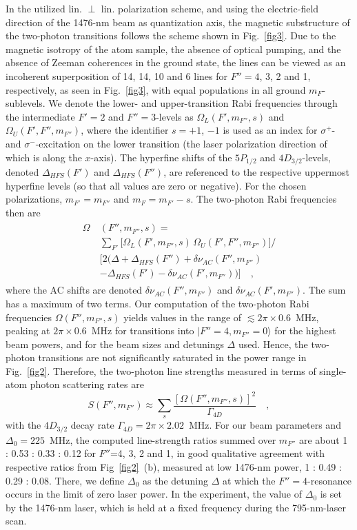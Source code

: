 \documentclass[reprint, amsmath,amssymb, aps, pra, longbibliography]{revtex4-1}
\begin{document}
In the utilized lin. $\perp$ lin. polarization scheme, and using the electric-field direction of the 1476-nm beam as quantization axis, the magnetic substructure of the two-photon transitions follows the scheme
shown in Fig.~\ref{fig3}. Due to the magnetic isotropy of the atom sample, the absence of optical pumping, and the absence of Zeeman coherences in the ground state, the lines can be viewed as an incoherent superposition of 14, 14, 10 and 6 lines for $F''=4$, 3, 2 and 1, respectively, as seen in Fig.~\ref{fig3}, with equal populations in all ground $m_F$-sublevels. 
We denote the lower- and upper-transition Rabi frequencies through the
intermediate $F'=2$ and $F''=3$-levels as $\Omega_{L} (F',m_{F''}, s)$ and $\Omega_{U} (F',F'',m_{F''})$, where the identifier $s=+1$, $-1$ is used as an index for $\sigma^+$- and $\sigma^-$-excitation on the lower transition (the laser polarization direction of which is along the $x$-axis). The hyperfine shifts of the
$5P_{1/2}$ and $4D_{3/2}$-levels, denoted
$\Delta_{HFS}(F')$ and $\Delta_{HFS}(F'')$, are referenced to the respective uppermost hyperfine levels (so that all values are zero or negative). For the chosen polarizations, $m_{F'}=m_{F''}$ and $m_F=m_{F'}-s$. The two-photon Rabi frequencies then are 
\begin{align}
\label{eq:2phrabi}
\begin{split}
\Omega\ &(F'',m_{F''}, s) = \\
&\sum_{F'} \big[ \Omega_{L} (F',m_{F''}, s) \, \Omega_{U} (F',F'',m_{F''}) \Big] / \\ 
&\big[2 (\Delta + \Delta_{HFS}(F'')  + \delta\nu_{AC}(F'',m_{F''}) \\ 
&-  \Delta_{HFS}(F')  -  \delta\nu_{AC}( F',m_{F''}) )\big] \quad,
\end{split}
\end{align}
where the AC shifts are denoted $\delta\nu_{AC}(F'',m_{F''})$ and $\delta\nu_{AC}(F',m_{F''})$. The sum has a maximum of two terms. 
Our computation of the two-photon Rabi frequencies $\Omega(F'',m_{F''}, s)$ 
yields values in the range of $\lesssim 2 \pi \times 0.6$~MHz, peaking at $2 \pi \times 0.6$~MHz for transitions into $\vert F''=4, m_{F''} = 0 \rangle$ for the highest beam powers, and for the beam sizes and detunings $\Delta$ used. Hence, the two-photon transitions are not significantly saturated in the power range in Fig.~\ref{fig2}. Therefore, the two-photon line strengths measured in terms of single-atom photon scattering rates are
\begin{equation}
S(F'',m_{F''}) \approx \sum_s \frac{ [ \Omega(F'',m_{F''}, s) ]^2}{\Gamma_{4D}} \quad,
\end{equation}
with the $4D_{3/2}$ decay rate $\Gamma_{4D} = 2 \pi \times 2.02$~MHz. For our beam parameters and $\Delta_0= 225$~MHz, the computed line-strength ratios summed over $m_{F''}$ are
about 1 : 0.53 : 0.33 : 0.12 for $F''$=4, 3, 2 and 1, in good qualitative agreement with respective ratios from Fig~\ref{fig2}~(b), measured at low 1476-nm power, 1 : 0.49 : 0.29 : 0.08. There, we define $\Delta_0$ as the detuning $\Delta$ at which the $F''=4$-resonance occurs in the limit of zero laser power. In the experiment, the value of $\Delta_0$ is set by the 1476-nm laser, which is held at a fixed frequency during the 795-nm-laser scan. 
\end{document}
